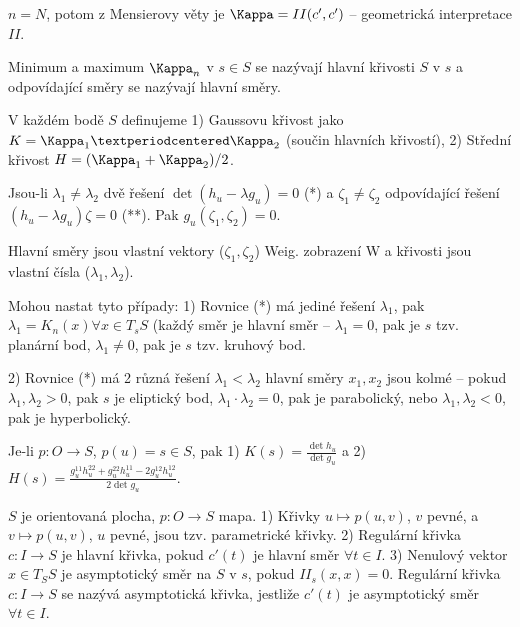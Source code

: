 \documentclass[12pt]{article}                   %
\begin{document}
        \begin{poznamka}
            $n = N$, potom z Mensierovy věty je $\Kappa = II(c', c')$ -- geometrická interpretace $II$.
        \end{poznamka}

        \begin{definice}
            Minimum a maximum $\Kappa_n$ v $s \in S$ se nazývají hlavní křivosti $S$ v $s$ a odpovídající směry se nazývají hlavní směry.
        \end{definice}

        \begin{definice}
            V každém bodě $S$ definujeme 1) Gaussovu křivost jako $K = \Kappa_1·\Kappa_2$ (součin hlavních křivostí), 2) Střední křivost $H = (\Kappa_1 + \Kappa_2)/2$.
        \end{definice}

        \begin{veta}
                Jsou-li $\lambda_1 ≠ \lambda_2$ dvě řešení $\det(h_u - \lambda g_u) = 0$ (*) a $\zeta_1 ≠ \zeta_2$ odpovídající řešení $(h_u - \lambda g_u)\zeta = 0$ (**). Pak $g_u(\zeta_1, \zeta_2) = 0$.

            Hlavní směry jsou vlastní vektory ($\zeta_1, \zeta_2$) Weig. zobrazení W a křivosti jsou vlastní čísla ($\lambda_1, \lambda_2$).
        \end{veta}

        \begin{definice}
            Mohou nastat tyto případy: 1) Rovnice (*) má jediné řešení $\lambda_1$, pak $\lambda_1 = K_n(x) \forall x \in T_sS$ (každý směr je hlavní směr -- $\lambda_1 = 0$, pak je $s$ tzv. planární bod, $\lambda_1 ≠ 0$, pak je $s$ tzv. kruhový bod.

            2) Rovnice (*) má 2 různá řešení $\lambda_1 < \lambda_2$ hlavní směry $x_1, x_2$ jsou kolmé -- pokud $\lambda_1, \lambda_2 > 0$, pak $s$ je eliptický bod, $\lambda_1·\lambda_2 = 0$, pak je parabolický, nebo $\lambda_1, \lambda_2 < 0$, pak je hyperbolický.
        \end{definice}

        \begin{veta}
            Je-li $p: O \rightarrow S$, $p(u) = s \in S$, pak 1) $K(s) = \frac{\det h_u}{\det g_u}$ a 2) $H(s) = \frac{g_u^{11}h_u^{22} + g^{22}_uh^{11}_u - 2g_u^{12}h_u^{12}}{2\det g_u}$.
        \end{veta}

        \begin{definice}
            $S$ je orientovaná plocha, $p: O \rightarrow S$ mapa. 1) Křivky $u \mapsto p(u, v)$, $v$ pevné, a $v \mapsto p(u, v)$, $u$ pevné, jsou tzv. parametrické křivky. 2) Regulární křivka $c: I \rightarrow S$ je hlavní křivka, pokud $c'(t)$ je hlavní směr $\forall t \in I$. 3) Nenulový vektor $x \in T_SS$ je asymptotický směr na $S$ v $s$, pokud $II_s(x, x) = 0$. Regulární křivka $c: I \rightarrow S$ se nazývá asymptotická křivka, jestliže $c'(t)$ je asymptotický směr $\forall t \in I$.
        \end{definice}
\end{document}
